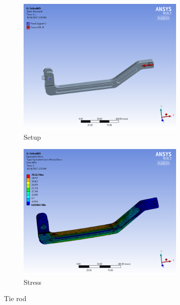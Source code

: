 \documentclass[10pt]{article}
\begin{document}
\begin{figure}[H]
\centering
\begin{subfigure}[b]{.48\textwidth}
\centering
\includegraphics[width=0.9\textwidth]{figures/fea/parts/MS00101-TieRod-Setup}
\caption{Setup}
\end{subfigure}
\begin{subfigure}[b]{.48\textwidth}
\centering
\includegraphics[width=0.9\textwidth]{figures/fea/parts/MS00101-TieRod-Stress}
\caption{Stress}
\end{subfigure}
\caption{Tie rod}
\label{fig:MS00101-TieRod}
\end{figure}
\end{document}
